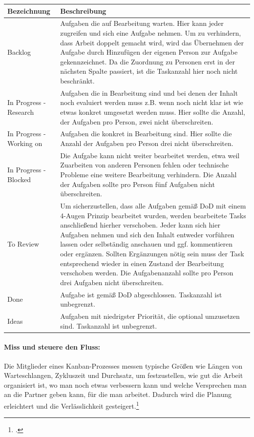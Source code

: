 \begin{minipage}{\textwidth}
\begin{center}
\begin{tabular}{p{2.5cm}p{13cm}}
\toprule
Bezeichnung & Beschreibung \\
\midrule
Backlog & Aufgaben die auf Bearbeitung warten. Hier kann jeder zugreifen und sich eine Aufgabe nehmen. Um zu verhindern, dass Arbeit doppelt gemacht wird, wird das Übernehmen der Aufgabe durch Hinzufügen der eigenen Person zur Aufgabe gekennzeichnet. Da die Zuordnung zu Personen erst in der nächsten Spalte passiert, ist die Taskanzahl hier noch nicht beschränkt. \\
In Progress - Research & Aufgaben die in Bearbeitung sind und bei denen der Inhalt noch evaluiert werden muss z.B. wenn noch nicht klar ist wie etwas konkret umgesetzt werden muss. Hier sollte die Anzahl, der Aufgaben pro Person, zwei nicht überschreiten. \\
In Progress - Working on & Aufgaben die konkret in Bearbeitung sind. Hier sollte die Anzahl der Aufgaben pro Person drei nicht überschreiten. \\
In Progress - Blocked & Die Aufgabe kann nicht weiter bearbeitet werden, etwa weil Zuarbeiten von anderen Personen fehlen oder technische Probleme eine weitere Bearbeitung verhindern. Die Anzahl der Aufgaben sollte pro Person fünf Aufgaben nicht überschreiten. \\
To Review & Um sicherzustellen, dass alle Aufgaben gemäß DoD mit einem 4-Augen Prinzip bearbeitet wurden, werden bearbeitete Tasks anschließend hierher verschoben. Jeder kann sich hier Aufgaben nehmen und sich den Inhalt entweder vorführen lassen oder selbständig anschauen und ggf. kommentieren oder ergänzen. Sollten Ergänzungen nötig sein muss der Task entsprechend wieder in einen Zustand der Bearbeitung verschoben werden. Die Aufgabenanzahl sollte pro Person drei Aufgaben nicht überschreiten. \\
Done & Aufgabe ist gemäß DoD abgeschlossen. Taskanzahl ist unbegrenzt. \\
Ideas & Aufgaben mit niedrigster Priorität, die optional umzusetzen sind. Taskanzahl ist unbegrenzt. \\
\bottomrule
\end{tabular}
\end{center}
\end{minipage}

\paragraph{Miss und steuere den Fluss:} Die Mitglieder eines Kanban-Prozesses
messen typische Größen wie Längen von Warteschlangen, Zykluszeit und Durchsatz,
um festzustellen, wie gut die Arbeit organisiert ist, wo man noch etwas
verbessern kann und welche Versprechen man an die Partner geben kann, für die
man arbeitet. Dadurch wird die Planung erleichtert und die Verlässlichkeit
gesteigert.\footcite{wikiKanban}

